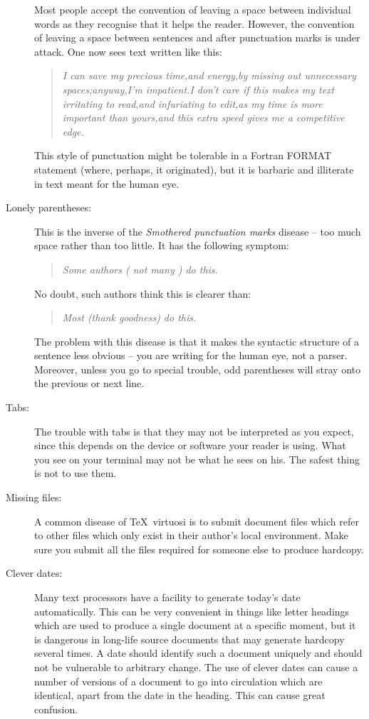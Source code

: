 \begin{description}
Most people accept the convention of leaving a space between individual words
as they recognise that it helps the reader.
However, the convention of leaving a space between sentences and after
punctuation marks is under attack.
One now sees text written like this:
\begin{quote}
{\em I can save my precious time,and energy,by missing out unnecessary
spaces;anyway,I'm impatient.I don't care if this makes my text
irritating to read,and infuriating to edit,as my time is more important than
yours,and this extra speed gives me a competitive edge.}
\end{quote}
This style of punctuation might be tolerable in a Fortran FORMAT statement
(where, perhaps, it originated), but it is barbaric and illiterate in text
meant for the human eye.

\item [Lonely parentheses:]

This is the inverse of the {\em Smothered punctuation marks} disease\/ --
too much space rather than too little.
It has the following symptom:
\begin{quote}
{\em Some authors ( not many ) do this.}
\end{quote}
No doubt, such authors think this is clearer than:
\begin{quote}
{\em Most (thank goodness) do this.}
\end{quote}
The problem with this disease is that it makes the syntactic structure of a
sentence less obvious -- you are writing for the human eye, not a parser.
Moreover, unless you go to special trouble, odd parentheses will stray onto the
previous or next line.

\item [Tabs:]

The trouble with tabs is that they may not be interpreted as you expect, since
this depends on the device or software your reader is using.
What you see on your terminal may not be what he sees on his.
The safest thing is not to use them.

\item [Missing files:]

A common disease of \TeX\ virtuosi is to submit document files which refer to
other files which only exist in their author's local environment.
Make sure you submit all the files required for someone else to produce
hardcopy.

\item [Clever dates:]

Many text processors have a facility to generate today's date automatically.
This can be very convenient in things like letter headings which are used
to produce a single document at a specific moment, but it is dangerous in
long-life source documents that may generate hardcopy several times.
A date should identify such a document uniquely and should not be vulnerable to
arbitrary change.
The use of clever dates can cause a number of versions of a document to go
into circulation which are identical, apart from the date in the heading.
This can cause great confusion.

\end{description}

